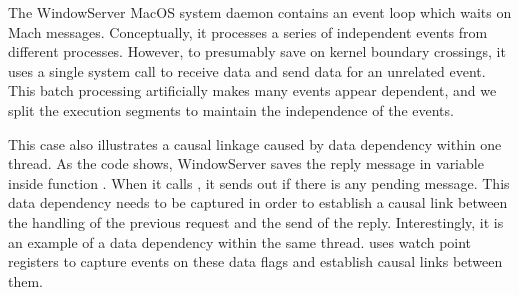 The WindowServer MacOS system daemon contains an event loop which waits on
Mach messages. Conceptually, it processes a series of independent events from
different processes. However, to presumably save on kernel boundary crossings,
it uses a single system call to receive data and send data for an unrelated
event. This batch processing artificially makes many events appear dependent,
and we split the execution segments to maintain the independence of the events.

This case also illustrates a causal linkage caused by data dependency within
one thread. As the code shows, WindowServer saves the reply message in variable
 inside function . When it calls
, it sends out  if there is any pending
message. This data dependency needs to be captured in order to establish a
causal link between the handling of the previous request and the send of the
reply. Interestingly, it is an example of a data dependency within the same
thread. \xxx uses watch point registers to capture events on these data flags
and establish causal links between them.

